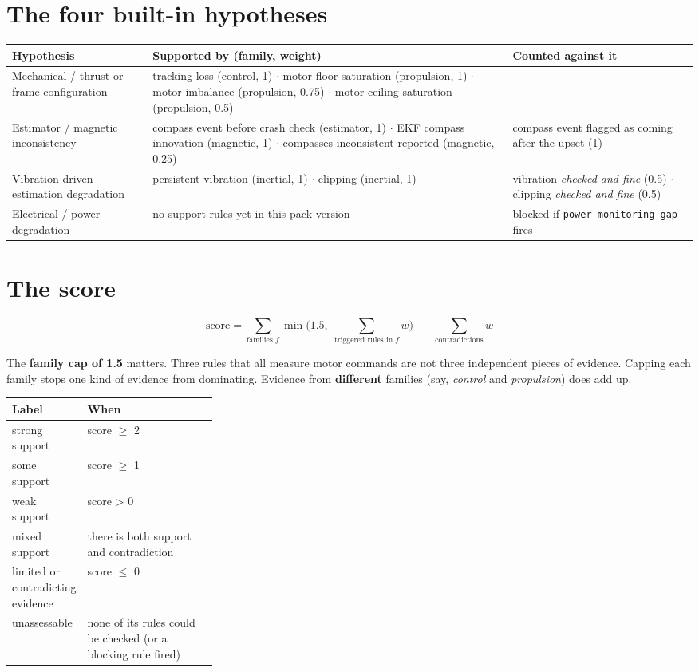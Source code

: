\documentclass[11pt,a4paper,openany]{book}
\begin{document}
\section{The four built-in hypotheses}

\begin{center}\small
\begin{tabularx}{\linewidth}{XXX}
\toprule
Hypothesis & Supported by (family, weight) & Counted against it \\
\midrule
Mechanical / thrust or frame configuration & tracking-loss (control, 1) $\cdot$ motor floor saturation (propulsion, 1) $\cdot$ motor imbalance (propulsion, 0.75) $\cdot$ motor ceiling saturation (propulsion, 0.5) & -- \\
Estimator / magnetic inconsistency & compass event before crash check (estimator, 1) $\cdot$ EKF compass innovation (magnetic, 1) $\cdot$ compasses inconsistent reported (magnetic, 0.25) & compass event flagged as coming after the upset (1) \\
Vibration-driven estimation degradation & persistent vibration (inertial, 1) $\cdot$ clipping (inertial, 1) & vibration \emph{checked and fine} (0.5) $\cdot$ clipping \emph{checked and fine} (0.5) \\
Electrical / power degradation & no support rules yet in this pack version & blocked if \texttt{power-monitoring-gap} fires \\
\bottomrule
\end{tabularx}
\end{center}

\section{The score}

\[
 \text{score} = \sum_{\text{families } f} \min\!\Big(1.5,\; \sum_{\text{triggered rules in } f} w\Big) \;-\; \sum_{\text{contradictions}} w 
\]

The \textbf{family cap of 1.5} matters. Three rules that all measure motor commands are not three independent pieces of
evidence. Capping each family stops one kind of evidence from dominating. Evidence from \textbf{different} families
(say, \emph{control} and \emph{propulsion}) does add up.

\begin{center}\small
\begin{tabularx}{\linewidth}{p{0.30\linewidth}X}
\toprule
Label & When \\
\midrule
strong support & score $\geq$ 2 \\
some support & score $\geq$ 1 \\
weak support & score > 0 \\
mixed support & there is both support and contradiction \\
limited or contradicting evidence & score $\leq$ 0 \\
unassessable & none of its rules could be checked (or a blocking rule fired) \\
\bottomrule
\end{tabularx}
\end{center}
\end{document}
